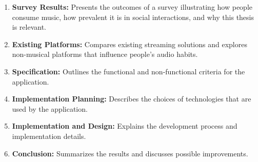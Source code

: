 \begin{enumerate}
    \item \textbf{Survey Results:}
    Presents the outcomes of a survey illustrating how people consume music, how prevalent it is in social interactions, and why this thesis is relevant.

    \item \textbf{Existing Platforms:}
    Compares existing streaming solutions and explores non-musical platforms that influence people’s audio habits.

    \item \textbf{Specification:}
    Outlines the functional and non-functional criteria for the application.

    \item \textbf{Implementation Planning:}
    Describes the choices of technologies that are used by the application.

    \item \textbf{Implementation and Design:}
    Explains the development process and implementation details.

    \item \textbf{Conclusion:}
    Summarizes the results and discusses possible improvements.
\end{enumerate}